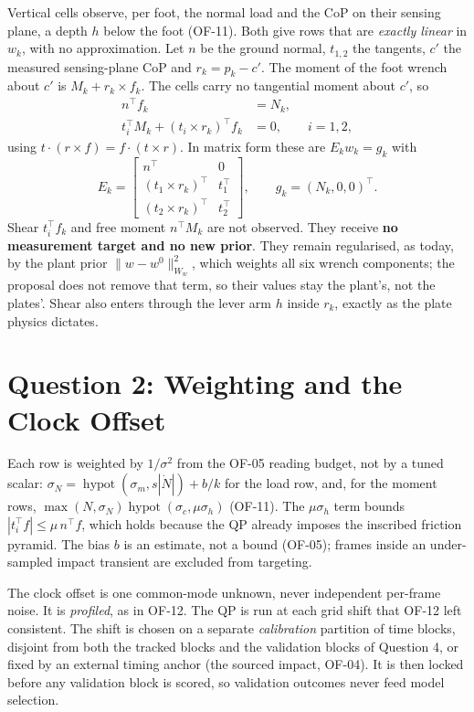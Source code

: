 \documentclass[11pt]{article}
\begin{document}
Vertical cells observe, per foot, the normal load and the CoP on their
sensing plane, a depth $h$ below the foot (OF-11). Both give rows that are
\emph{exactly linear} in $w_k$, with no approximation. Let $n$ be the ground
normal, $t_{1,2}$ the tangents, $c'$ the measured sensing-plane CoP and
$r_k = p_k - c'$. The moment of the foot wrench about $c'$ is
$M_k + r_k \times f_k$. The cells carry no tangential moment about $c'$, so
\begin{align}
  n^\top f_k &= N_k, \\
  t_i^\top M_k + (t_i \times r_k)^\top f_k &= 0, \qquad i = 1, 2,
\end{align}
using $t\cdot(r\times f) = f\cdot(t\times r)$. In matrix form these are
$E_k w_k = g_k$ with
\begin{equation}
  E_k = \begin{bmatrix} n^\top & 0 \\ (t_1\times r_k)^\top & t_1^\top \\
  (t_2\times r_k)^\top & t_2^\top \end{bmatrix},\qquad
  g_k = (N_k, 0, 0)^\top .
\end{equation}
Shear $t_i^\top f_k$ and free moment $n^\top M_k$ are not observed. They
receive \textbf{no measurement target and no new prior}. They remain
regularised, as today, by the plant prior $\|w-w^0\|^2_{W_w}$, which weights
all six wrench components; the proposal does not remove that term, so their
values stay the plant's, not the plates'. Shear also enters through the lever
arm $h$ inside $r_k$, exactly as the plate physics dictates.

\section{Question 2: Weighting and the Clock Offset}

Each row is weighted by $1/\sigma^2$ from the OF-05 reading budget, not by a
tuned scalar:
$\sigma_N = \operatorname{hypot}(\sigma_m, s|\dot N|) + b/k$ for the load
row, and, for the moment rows,
$\max(N,\sigma_N)\operatorname{hypot}(\sigma_c, \mu\sigma_h)$ (OF-11). The
$\mu\sigma_h$ term bounds $|t_i^\top f| \le \mu\, n^\top f$, which holds
because the QP already imposes the inscribed friction pyramid. The bias $b$ is
an estimate, not a bound (OF-05); frames inside an under-sampled impact
transient are excluded from targeting.

The clock offset is one common-mode unknown, never independent per-frame
noise. It is \emph{profiled}, as in OF-12. The QP is run at each grid shift
that OF-12 left consistent. The shift is chosen on a separate
\emph{calibration} partition of time blocks, disjoint from both the tracked
blocks and the validation blocks of Question 4, or fixed by an external timing
anchor (the sourced impact, OF-04). It is then locked before any validation
block is scored, so validation outcomes never feed model selection.
\end{document}

